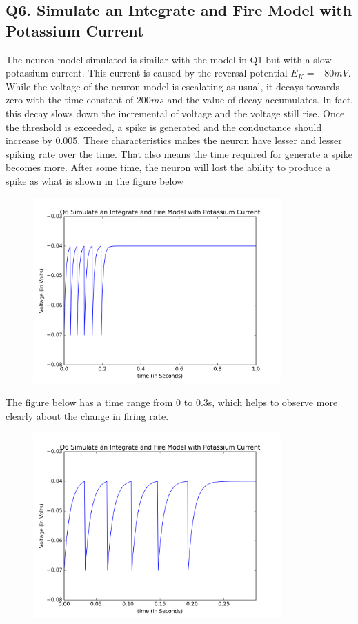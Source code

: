 \documentclass[DIV=calc, paper=a4, fontsize=12pt, twocolumn]{article}	 %
\begin{document}
	\subsection*{Q6. Simulate an Integrate and Fire Model with Potassium Current}
	The neuron model simulated is similar with the model in Q1 but with a slow potassium current. This current is caused by the reversal potential $E_K = -80mV$. While the voltage of the neuron model is escalating as usual, it decays towards zero with the time constant of $200ms$ and the value of decay accumulates. In fact, this decay slows down the incremental of voltage and the voltage still rise. Once the threshold is exceeded, a spike is generated and the conductance should increase by 0.005. These characteristics makes the neuron have lesser and lesser spiking rate over the time. That also means the time required for generate a spike becomes more. After some time, the neuron will lost the ability to produce a spike as what is shown in the figure below
    
	\par
		\begin{figure}[htb]
			\includegraphics*[width = 9.5cm]{Q6} 
		\end{figure}
 	The figure below has a time range from 0 to 0.3s, which helps to observe more clearly about the change in firing rate.        
        \begin{figure}[htb]
			\includegraphics*[width = 9.5cm]{Q6_extra} 
		\end{figure}
	\bigskip
\end{document}
